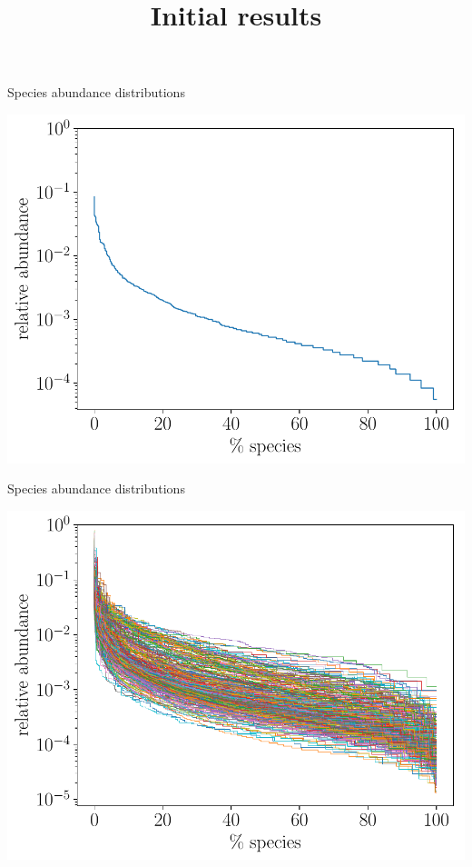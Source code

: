 \documentclass[
  ignorenonframetext,
]{beamer}
\title{Initial results}
\date{}
\begin{document}
\frame{\titlepage}

\begin{frame}{Species abundance distributions}
\protect\hypertarget{species-abundance-distributions}{}

\includegraphics[width=\linewidth]{figs/species_abundance_curve_0.pdf}

\end{frame}

\begin{frame}{Species abundance distributions}
\protect\hypertarget{species-abundance-distributions-1}{}

\includegraphics[width=\linewidth]{figs/species_abundance_curve_4.pdf}

\end{frame}
\end{document}
